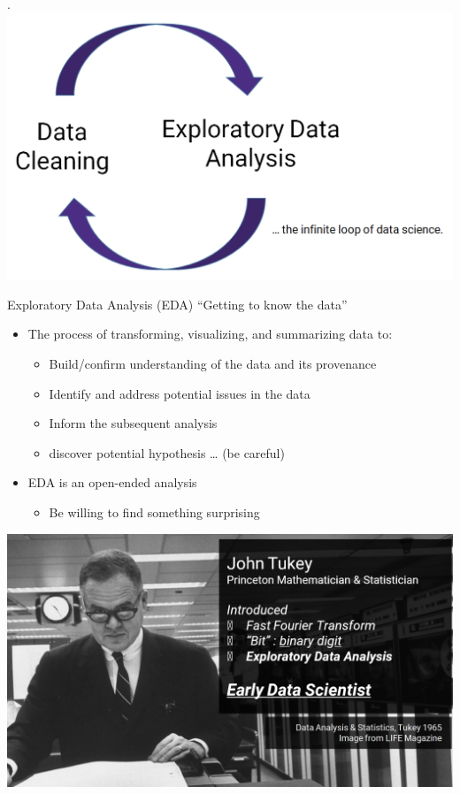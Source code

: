 \documentclass[aspectratio=169]{../latex_main/tntbeamer}  %
\begin{document}
	
	
	\begin{frame}{.}
	    \centering
	    \includegraphics[scale=.38]{Bild4}
	\end{frame}
	
	
		\begin{frame}{Exploratory Data Analysis (EDA)}
		    \centering “Getting to know the data”
	    \begin{itemize}
	        \item The process of transforming, visualizing, and summarizing data to:
	        \begin{itemize}
	            \item Build/confirm understanding of the data and its provenance
	            \item Identify and address potential issues in the data
	            \item Inform the subsequent analysis
	            \item discover potential hypothesis … (be careful)
	        \end{itemize}
            \item EDA is an open-ended analysis
            \begin{itemize}
                \item Be willing to find something surprising
            \end{itemize}

	    \end{itemize}
	\end{frame}
	
	
	
	\begin{frame}
	    \centering
	    \includegraphics[scale=.38]{Bild6}
	\end{frame}
	
\end{document}
